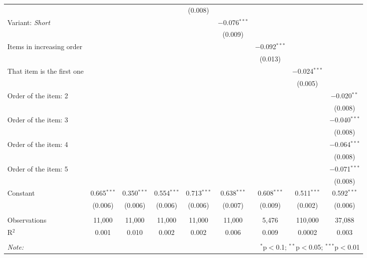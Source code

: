 \begin{tabular}{@{\extracolsep{5pt}}lcccccccc}
  &  &  &  & (0.008) &  &  &  &  \\ 
  Variant: \textit{Short} &  &  &  &  & $-$0.076$^{***}$ &  &  &  \\ 
  &  &  &  &  & (0.009) &  &  &  \\ 
  Items in increasing order &  &  &  &  &  & $-$0.092$^{***}$ &  &  \\ 
  &  &  &  &  &  & (0.013) &  &  \\ 
  That item is the first one &  &  &  &  &  &  & $-$0.024$^{***}$ &  \\ 
  &  &  &  &  &  &  & (0.005) &  \\ 
  Order of the item: 2 &  &  &  &  &  &  &  & $-$0.020$^{**}$ \\ 
  &  &  &  &  &  &  &  & (0.008) \\ 
  Order of the item: 3 &  &  &  &  &  &  &  & $-$0.040$^{***}$ \\ 
  &  &  &  &  &  &  &  & (0.008) \\ 
  Order of the item: 4 &  &  &  &  &  &  &  & $-$0.064$^{***}$ \\ 
  &  &  &  &  &  &  &  & (0.008) \\ 
  Order of the item: 5 &  &  &  &  &  &  &  & $-$0.071$^{***}$ \\ 
  &  &  &  &  &  &  &  & (0.008) \\ 
  Constant & 0.665$^{***}$ & 0.350$^{***}$ & 0.554$^{***}$ & 0.713$^{***}$ & 0.638$^{***}$ & 0.608$^{***}$ & 0.511$^{***}$ & 0.592$^{***}$ \\ 
  & (0.006) & (0.006) & (0.006) & (0.006) & (0.007) & (0.009) & (0.002) & (0.006) \\ 
 \hline \\[-1.8ex] 
Observations & 11,000 & 11,000 & 11,000 & 11,000 & 11,000 & 5,476 & 110,000 & 37,088 \\ 
R$^{2}$ & 0.001 & 0.010 & 0.002 & 0.002 & 0.006 & 0.009 & 0.0002 & 0.003 \\ 
\hline 
\hline \\[-1.8ex] 
\textit{Note:}  & \multicolumn{8}{r}{$^{*}$p$<$0.1; $^{**}$p$<$0.05; $^{***}$p$<$0.01} \\ 
\end{tabular} 
